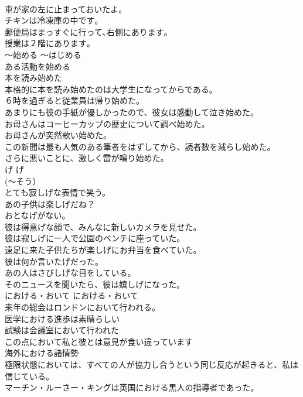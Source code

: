 \documentclass[8pt]{extreport}
\begin{document}
\begin{CJK}{UTF8}{min}
\\	車が家の左に止まっておいたよ｡   
\\	チキンは冷凍庫の中です｡   
\\	郵便局はまっすぐに行って､右側にあります｡   
\\	授業は２階にあります｡  
\\	〜始める	〜はじめる	
\\	ある活動を始める	
\\	本を読み始めた  
\\	本格的に本を読み始めたのは大学生になってからである。  
\\	６時を過ぎると従業員は帰り始めた。  
\\	あまりにも彼の手紙が優しかったので、彼女は感動して泣き始めた。  
\\	お母さんはコーヒーカップの歴史について調べ始めた。  
\\	お母さんが突然歌い始めた。  
\\	この新聞は最も人気のある筆者をはずしてから、読者数を減らし始めた。  
\\	さらに悪いことに、激しく雷が鳴り始めた。  
\\	げ	げ	
\\	(〜そう）	
\\	とても寂しげな表情で笑う。  
\\	あの子供は楽しげだね？  
\\	おとなげがない。  
\\	彼は得意げな顔で、みんなに新しいカメラを見せた。  
\\	彼は寂しげに一人で公園のベンチに座っていた。  
\\	遠足に来た子供たちが楽しげにお弁当を食べていた。  
\\	彼は何か言いたげだった。   
\\	あの人はさびしげな目をしている。  
\\	そのニュースを聞いたら、彼は嬉しげになった。  
\\	における・おいて	における・おいて	
\\	来年の総会はロンドンにおいて行われる。  
\\	医学における進歩は素晴らしい  
\\	試験は会議室において行われた  
\\	この点において私と彼とは意見が食い違っています  
\\	海外における諸情勢  
\\	極限状態においては、すべての人が協力し合うという同じ反応が起きると、私は信じている。  
\\	マーチン・ルーさー・キングは英国における黒人の指導者であった。  

\end{CJK}
\end{document}
